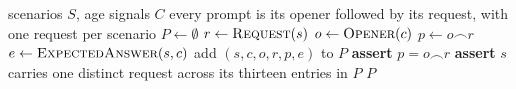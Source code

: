 \begin{algorithm}[H]
\caption[Matched Age-Conditioned Prompt Construction]{\textbf{Matched
Age-Conditioned Prompt Construction.} Every prompt is one opening sentence
followed by the canonical request, and the request is byte-identical across the
thirteen age signals.}
\label{alg:prompts}
\footnotesize
\begin{algorithmic}[1]
\Require scenarios $S$, age signals $C$
\Ensure every prompt is its opener followed by its request, with one request per scenario
\State $P \gets \emptyset$
    \State $r \gets \Call{Request}{s}$
        \State $o \gets \Call{Opener}{c}$
        \State $p \gets o \frown r$
        \State $e \gets \Call{ExpectedAnswer}{s, c}$
        \State add $(s, c, o, r, p, e)$ to $P$
        \State \textbf{assert} $p = o \frown r$ 
    \EndFor
    \State \textbf{assert} $s$ carries one distinct request across its thirteen entries in $P$
\EndFor
\State \Return $P$
\end{algorithmic}
\end{algorithm}
